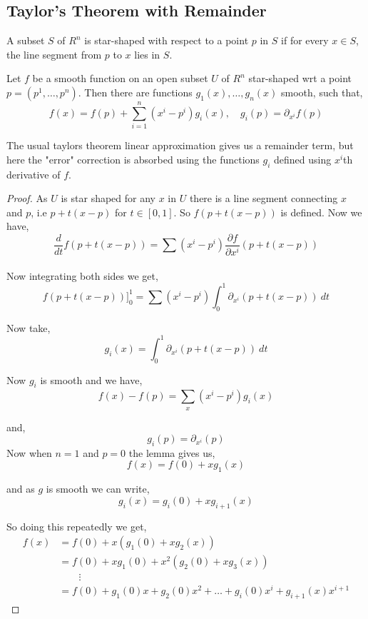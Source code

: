 \subsection{Taylor's Theorem with Remainder}
A subset $S$ of $R^{n}$ is star-shaped with respect to a point $p$ in $S$ if for every $x \in S$, the line segment from $p$ to $x$ lies in $S$.
\begin{lemma}
  Let $f$ be a smooth function on an open subset $U$ of $R^{n}$ star-shaped wrt a point $p = (p^{1}, \dots, p^{n})$. Then there are functions $g_{1}(x), \dots, g_n(x)$ smooth, such that, 
  \[
    f(x) = f(p) + \sum_{i = 1}^{n} (x^{i} - p^{i}) g_i(x), \quad g_i(p) = \partial_{x^{i}}  f(p)
  \]
\end{lemma}
\begin{remark}
  The usual taylors theorem linear approximation gives us a remainder term, but here the "error" correction is absorbed using the functions $g_i$ defined using $x^{i}$th derivative of $f$.
\end{remark}
\begin{proof}
  As $U$ is star shaped for any $x$ in $U$ there is a line segment connecting $x$ and $p$, i.e $p + t(x - p)$ for $t \in [0, 1]$. So $f(p + t(x - p))$ is defined. Now we have, 
  \[
    \frac{d}{dt}f(p + t(x - p)) = \sum_{}^{} (x^{i} - p^{i}) \frac{\partial f}{\partial x^{i}} (p + t(x - p))
  \]

  Now integrating both sides we get, 
  \[
    f(p + t(x - p))]_0^{1} = \sum_{}^{} (x^{i} - p^{i})  \int_{0}^{1} \partial_{x^{i}} (p + t(x - p)) \ dt
  \]

  Now take, 
  \[
    g_i(x) = \int_{0}^{1}  \partial_{x^{i}}(p + t(x - p)) \ dt
  \]

  Now $g_i$ is smooth and we have,
  \[
    f(x) - f(p)  = \sum_{x^{}}^{}  (x^{i} - p^{i}) g_i(x)
  \]

  and, 
  \[
    g_i(p) = \partial_{x^{i}}(p)
  \]
  Now when $n = 1$ and $p = 0$ the lemma gives us, 
  \[
    f(x) = f(0) + xg_1(x)
  \]

  and as $g$ is smooth we can write, 
  \[
    g_i(x) = g_i(0) + xg_{i+ 1}(x)
  \]

  So doing this repeatedly we get, 
  \begin{align*}
    f(x) &= f(0) + x(g_{1}(0) + xg_{2}(x))\\
         &= f(0) + xg_{1}(0) + x^2(g_{2}(0) + xg_{3}(x))\\
         &\qquad \vdots\\
         &= f(0) + g_{1}(0)x + g_{2}(0)x^2 + \dots + g_i(0)x^{i} + g_{i + 1}(x)x^{i + 1}
  \end{align*}

\end{proof}
